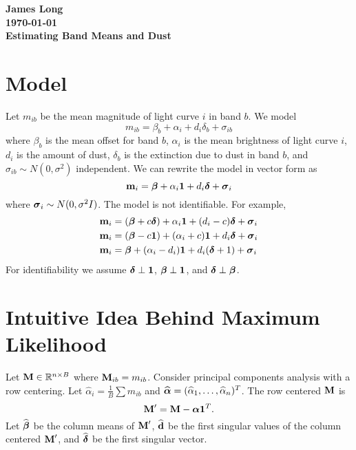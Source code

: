 \documentclass[12pt]{article}
\title{}
\date{}
\author{}
\newcommand{\V}[1]{{\bm{\mathbf{\MakeLowercase{#1}}}}} %
\newcommand{\M}[1]{{\bm{\mathbf{\MakeUppercase{#1}}}}} %
\begin{document}
\noindent
\textbf{James Long}\\
\textbf{\today}\\
\textbf{Estimating Band Means and Dust}

\section{Model}

Let $m_{ib}$ be the mean magnitude of light curve $i$ in band $b$. We model
\begin{equation*}
m_{ib} = \beta_b + \alpha_i + d_i\delta_b + \sigma_{ib}
\end{equation*}
where $\beta_b$ is the mean offset for band $b$, $\alpha_i$ is the mean brightness of light curve $i$, $d_i$ is the amount of dust, $\delta_b$ is the extinction due to dust in band $b$, and $\sigma_{ib} \sim N(0,\sigma^2)$ independent. We can rewrite the model in vector form as
\begin{equation*}
\V{m}_i = \V{\beta} + \alpha_i \V{1} + d_i \V{\delta} + \V{\sigma}_i
\end{equation*}
where $\V{\sigma}_i \sim N(0,\sigma^2I)$. The model is not identifiable. For example,
\begin{align*}
\V{m}_i &= (\V{\beta} + c\V{\delta}) + \alpha_i \V{1} + (d_i - c) \V{\delta} + \V{\sigma}_i\\
\V{m}_i &= (\V{\beta} - c\V{1}) + (\alpha_i + c)\V{1} + d_i\V{\delta} + \V{\sigma}_i\\
\V{m}_i &= \V{\beta} + (\alpha_i - d_i)\V{1} + d_i(\V{\delta} + 1) + \V{\sigma}_i\\
\end{align*}
For identifiability we assume $\V{\delta} \perp \V{1}$, $\V{\beta} \perp \V{1}$, and $\V{\delta} \perp \V{\beta}$.


\section{Intuitive Idea Behind Maximum Likelihood}

Let $\M{M} \in \mathbb{R}^{n \times B}$ where $\M{M}_{ib} = m_{ib}$. Consider principal components analysis with a row centering. Let $\widehat{\alpha}_i = \frac{1}{B} \sum m_{ib}$ and $\widehat{\V{\alpha}} = (\widehat{\alpha}_1,\ldots,\widehat{\alpha}_n)^T$. The row centered $\M{M}$ is
\begin{equation*}
\M{M}' = \M{M} - \V{\alpha}\V{1}^T.
\end{equation*}
Let $\widehat{\V{\beta}}$ be the column means of $\M{M}'$, $\widehat{\V{d}}$ be the first singular values of the column centered $\M{M}'$, and $\widehat{\V{\delta}}$ be the first singular vector.
\end{document}
